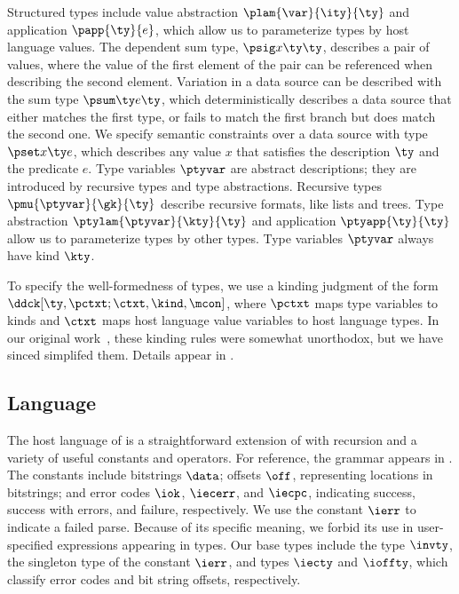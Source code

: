 Structured types include value abstraction $\plam{\var}{\ity}{\ty}$
and application $\papp{\ty}{e}$, which allow us to parameterize types
by host language values. 
The dependent sum type, $\psig x \ty \ty$, describes a pair of values,
where the value of the first element of the pair can be referenced
when describing the second element.  Variation in a data source can be
described with the sum type $\psum \ty e \ty$, which deterministically
describes a data source that either matches the first type, or fails
to match the first branch but does match the second one.
We specify semantic constraints over a data source
with type $\pset x \ty e$, which describes any value $x$ that satisfies the
description $\ty$ and the predicate $e$. Type variables $\ptyvar$ are
abstract descriptions; they are introduced by recursive types and type
abstractions. Recursive types $\pmu{\ptyvar}{\gk}{\ty}$ describe
recursive formats, like lists and trees. Type abstraction
$\ptylam{\ptyvar}{\kty}{\ty}$ and application $\ptyapp{\ty}{\ty}$
allow us to parameterize types by other types.  Type variables $\ptyvar$
always have kind $\kty$.

To specify the well-formedness of types, 
we use a kinding judgment of the form
$\ddck[\ty,\pctxt;\ctxt,\kind,\mcon]$,
where $\pctxt$ maps type variables 
to kinds and $\ctxt$ maps host language value variables to host language 
types. In our original work~\cite{fisher+:next700ddl}, these kinding rules
were somewhat unorthodox, but we have sinced simplifed them.  
Details appear in .

\subsection{\Implang{} Language}
\label{sec:host-lang}
The host language of \ddc{} is a straightforward 
extension of \fomega{} with recursion and a variety of useful constants
and operators.  
For reference, the grammar appears in .
The constants include bitstrings $\data$; offsets $\off$, representing
locations in bitstrings; and error codes $\iok$, $\iecerr$, and
$\iecpc$, indicating success, success with errors, and failure,
respectively. We use the constant $\ierr$ to indicate a failed parse.
Because of its specific meaning, we forbid its use in user-specified
expressions appearing in \ddc{} types.
Our base types include the type $\invty$, the singleton type of the
constant $\ierr$, and types $\iecty$ and $\ioffty$, which classify
error codes and bit string offsets, respectively.

